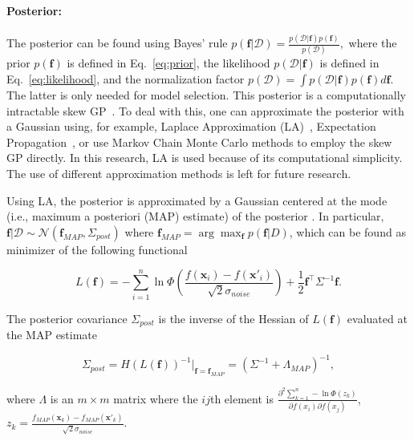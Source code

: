 \documentclass{article}
\begin{document}
\paragraph{Posterior:}
The posterior can be found using Bayes' rule
$p(\mathbf{f}|\mathcal{D}) = \frac{p(\mathcal{D}|\mathbf{f})p(\mathbf{f})}{p(\mathcal{D})},$
where the prior $p(\mathbf{f})$ is defined in Eq.~\ref{eq:prior}, the likelihood $p(\mathcal{D}|\mathbf{f})$ is defined in Eq.~\ref{eq:likelihood}, and the normalization factor $p(\mathcal{D}) = \int p(\mathcal{D}|\mathbf{f})p(\mathbf{f})d\mathbf{f}$. The latter is only needed for model selection. This posterior is a computationally intractable skew GP~\cite{benavoli2021preferential}. To deal with this, one can approximate the posterior with a Gaussian using, for example, Laplace Approximation (LA)~\cite{chu2005preference}, Expectation Propagation~\cite{minka2013expectation}, or use Markov Chain Monte Carlo methods to employ the skew GP directly. In this research, LA is used because of its computational simplicity. The use of different approximation methods is left for future research.

Using LA, the posterior is approximated by a Gaussian centered at the mode (i.e., maximum a posteriori (MAP) estimate) of the posterior \cite{chu2005preference}. In particular, $\mathbf{f}|\mathcal{D} \sim \mathcal{N}(\mathbf{f}_{MAP}, \Sigma_{post})$ where $\mathbf{f}_{MAP} = \arg \max_{\mathbf{f}}p(\mathbf{f}|D)$, which can be found as minimizer of the following functional

\begin{equation}\label{eq:GP_fMAP}
    L(\mathbf{f}) = - \sum_{i=1}^n \ln \Phi(\frac{f(\mathbf{x}_i) - f(\mathbf{x}'_i)}{\sqrt{2}\sigma_{noise} }) + \frac{1}{2}\mathbf{f}^\top\Sigma^{-1} \mathbf{f}.
\end{equation}

The posterior covariance $\Sigma_{post}$ is the inverse of the Hessian of $L(\mathbf{f})$ evaluated at the MAP estimate

\begin{equation}\label{eq:GP_cov}
    \Sigma_{post} = H(L(\mathbf{f}))^{-1}|_{\mathbf{f} = \mathbf{f}_{MAP}} = (\Sigma^{-1} + \Lambda_{MAP})^{-1},
\end{equation}

where $\Lambda$ is an $m \times m$ matrix where the $ij$th element is $\frac{\partial^2 \sum_{k=1}^n - \ln \Phi(z_k)}{\partial f(x_i)\partial f(x_j)}$, $z_k = \frac{f_{MAP}(\mathbf{x}_k) - f_{MAP}(\mathbf{x}'_k)}{\sqrt{2}\sigma_{noise} }$.
\end{document}
